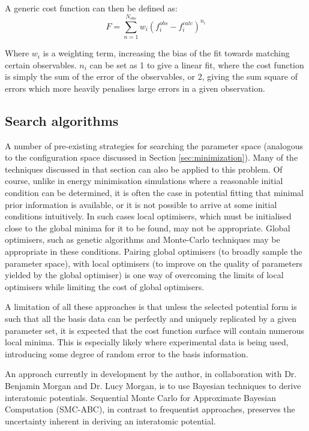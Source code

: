 A generic cost function can then be defined as:
\begin{equation}
	F = \sum_{n=1}^{N_{obs}}w_i(f_i^{obs} - f_i^{calc})^{n_i}
\end{equation}

Where $w_i$ is a weighting term, increasing the bias of the fit towards matching certain observables.
$n_i$ can be set as 1 to give a linear fit, where the cost function is simply the sum of the error of the observables, or 2, giving the sum square of errors which more heavily penalises large errors in a given observation.

\subsection{Search algorithms}
A number of pre-existing strategies for searching the parameter space (analogous to the configuration space discussed in Section \ref{sec:minimization}).
Many of the techniques discussed in that section can also be applied to this problem.
Of course, unlike in energy minimisation simulations where a reasonable initial condition can be determined, it is often the case in potential fitting that minimal prior information is available, or it is not possible to arrive at some initial conditions intuitively.
In such cases local optimisers, which must be initialised close to the global minima for it to be found, may not be appropriate.
Global optimisers, such as genetic algorithms and Monte-Carlo techniques may be appropriate in these conditions.
Pairing global optimisers (to broadly sample the parameter space), with local optimisers (to improve on the quality of parameters yielded by the global optimiser) is one way of overcoming the limits of local optimisers while limiting the cost of global optimisers.

A limitation of all these approaches is that unless the selected potential form is such that all the basis data can be perfectly and uniquely replicated by a given parameter set, it is expected that the cost function surface will contain numerous local minima.
This is especially likely where experimental data is being used, introducing some degree of random error to the basis information.

An approach currently in development by the author, in collaboration with Dr. Benjamin Morgan and Dr. Lucy Morgan, is to use Bayesian techniques to derive interatomic potentials.
Sequential Monte Carlo for Approximate Bayesian Computation (SMC-ABC),\cite{Toni2009a} in contrast to frequentist approaches, preserves the uncertainty inherent in deriving an interatomic potential.

